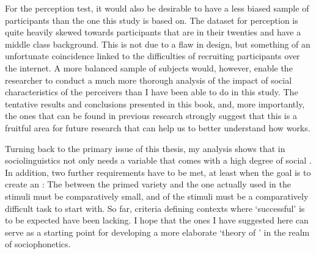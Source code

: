 For the perception test, it would also be desirable to have a less biased sample of participants than the one this study is based on.
The dataset for perception is quite heavily skewed towards participants that are in their twenties and have a middle class background.
This is not due to a flaw in design, but something of an unfortunate coincidence linked to the difficulties of recruiting participants over the internet.
A more balanced sample of subjects would, however, enable the researcher to conduct a much more thorough analysis of the impact of social characteristics of the perceivers than I have been able to do in this study.
The tentative results and conclusions presented in this book, and, more importantly, the ones that can be found in previous research \parencite[cf.][]{hayetal2006a,haydrager2010} strongly suggest that this is a fruitful area for future research that can help us to better understand how  works.

Turning back to the primary issue of this thesis, my analysis shows that   in sociolinguistics not only needs a variable that comes with a high degree of social .
In addition, two further requirements have to be met, at least when the goal is to create an : 
The  between the primed variety and the one actually used in the stimuli must be comparatively small, and  of the stimuli must be a comparatively difficult task to start with.
So far, criteria defining contexts where `successful'   is to be expected have been lacking.
I hope that the ones I have suggested here can serve as a starting point for developing a more elaborate `theory of ' \parencite[cf.][]{cesario2014} in the realm of sociophonetics.
